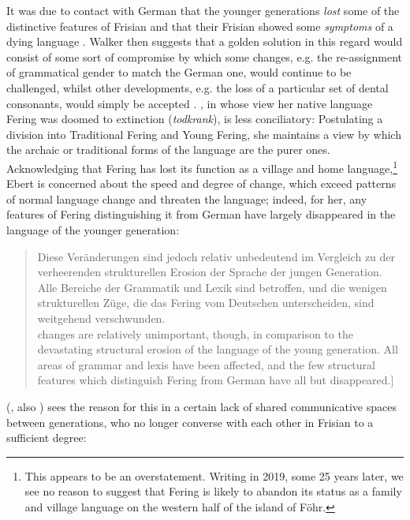\documentclass[output=paper]{langsci/langscibook}
\begin{document}
It was due to contact with German that the younger generations \textit{lost} some of the distinctive features of Frisian and that their Frisian showed some \textit{symptoms} of a dying language \citep[210]{Walker1986}. Walker then suggests that a golden solution in this regard would consist of some sort of compromise by which some changes, e.g. the re-assignment of grammatical gender to match the German one, would continue to be challenged, whilst other developments, e.g. the loss of a particular set of dental consonants, would simply be accepted \citep[211]{Walker1986}. \citet{Ebert1994}, in whose view her native language Fering was doomed to extinction (\textit{todkrank}), is less conciliatory: Postulating a division into Traditional Fering and Young Fering, she maintains a view by which the archaic or traditional forms of the language are the purer ones. Acknowledging that Fering has lost its function as a village and home language,\footnote{This appears to be an overstatement. Writing in 2019, some 25 years later, we see no reason to suggest that Fering is likely to abandon its status as a family and village language on the western half of the island of Föhr.} Ebert is concerned about the speed and degree of change, which exceed patterns of normal language change and threaten the language; indeed, for her, any features of Fering distinguishing it from German have largely disappeared in the language of the younger generation:

\begin{quote}
Diese Veränderungen sind jedoch relativ unbedeutend im Vergleich zu der verheerenden strukturellen Erosion der Sprache der jungen Generation. Alle Bereiche der Grammatik und Lexik sind betroffen, und die wenigen strukturellen Züge, die das Fering vom Deutschen unterscheiden, sind weitgehend verschwunden. \citep[11]{Ebert1994}\bigskip\\\relax
[These [aforementioned] changes are relatively unimportant, though, in comparison to the devastating structural erosion of the language of the young generation. All areas of grammar and lexis have been affected, and the few structural features which distinguish Fering from German have all but disappeared.]
\end{quote}

\citeauthor{Sjolin1997} (\citeyear{Sjolin1997}, also \citeyear{Sjolin1976}) sees the reason for this in a certain lack of shared communicative spaces between generations, who no longer converse with each other in Frisian to a sufficient degree: 
\end{document}
